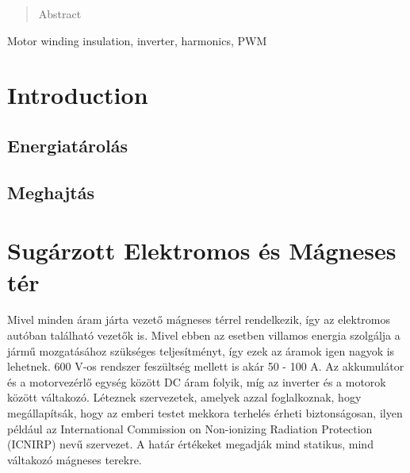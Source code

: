 \begin{abstract}
Abstract
\end{abstract}

\begin{IEEEkeywords}
Motor winding insulation, inverter, harmonics, PWM
\end{IEEEkeywords}


%
\IEEEpeerreviewmaketitle


\section{Introduction}

\subsection{Energiatárolás}


\subsection{Meghajtás}




\section{Sugárzott Elektromos és Mágneses tér}

Mivel minden áram járta vezető mágneses térrel rendelkezik, így az elektromos autóban található vezetők is.  Mivel ebben az esetben villamos energia szolgálja a jármű mozgatásához szükséges teljesítményt, így ezek az áramok igen nagyok is lehetnek. 600 V-os rendszer feszültség mellett is akár 50 - 100 A. Az akkumulátor és a motorvezérlő egység között DC áram folyik, míg az inverter és a motorok között váltakozó. Léteznek szervezetek, amelyek azzal foglalkoznak, hogy megállapítsák, hogy az emberi testet mekkora terhelés érheti biztonságosan, ilyen például az International Commission on Non-ionizing Radiation Protection (ICNIRP) nevű szervezet. A határ értékeket megadják mind statikus, mind váltakozó mágneses terekre.

